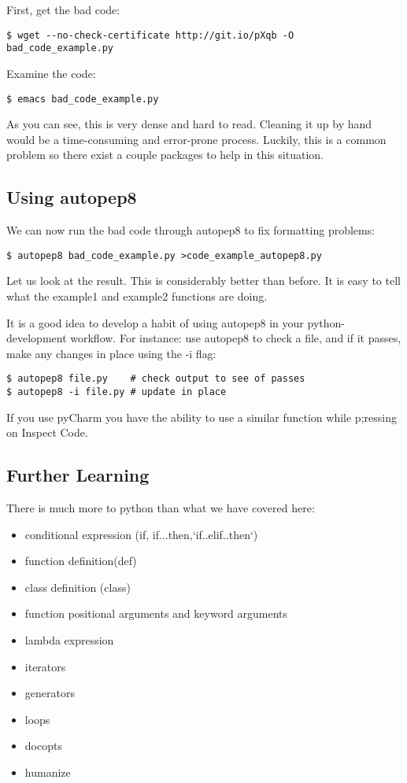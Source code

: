 First, get the bad code:

\begin{verbatim}
$ wget --no-check-certificate http://git.io/pXqb -O bad_code_example.py
\end{verbatim}

Examine the code:

\begin{verbatim}
$ emacs bad_code_example.py
\end{verbatim}

As you can see, this is very dense and hard to read. Cleaning it up by
hand would be a time-consuming and error-prone process. Luckily, this is
a common problem so there exist a couple packages to help in this
situation.

\subsection{Using autopep8}\label{using-autopep8}

We can now run the bad code through autopep8 to fix formatting problems:

\begin{verbatim}
$ autopep8 bad_code_example.py >code_example_autopep8.py
\end{verbatim}

Let us look at the result. This is considerably better than before. It
is easy to tell what the example1 and example2 functions are doing.

It is a good idea to develop a habit of using autopep8 in your
python-development workflow. For instance: use autopep8 to check a file,
and if it passes, make any changes in place using the -i flag:

\begin{verbatim}
$ autopep8 file.py    # check output to see of passes
$ autopep8 -i file.py # update in place
\end{verbatim}

If you use pyCharm you have the ability to use a similar function while
p;ressing on Inspect Code.

\subsection{Further Learning}\label{further-learning}

There is much more to python than what we have covered here:

\begin{itemize}
\tightlist
\item
  conditional expression (if, if...then,`if..elif..then`)
\item
  function definition(def)
\item
  class definition (class)
\item
  function positional arguments and keyword arguments
\item
  lambda expression
\item
  iterators
\item
  generators
\item
  loops
\item
  docopts
\item
  humanize
\end{itemize}

